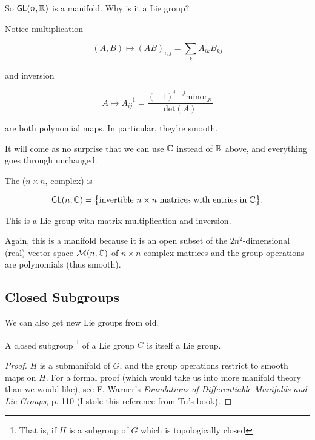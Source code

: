 \documentclass[../main.tex]{subfiles}
\begin{document}
So $\mathsf{GL}(n,\mathbb{R})$ is a manifold. Why is it a Lie group?

Notice multiplication

\[
  (A,B) \mapsto (AB)_{i,j} = \sum_k A_{ik} B_{kj}
\]

and inversion

\[
  A \mapsto A^{-1}_{ij} = \frac{(-1)^{i+j} \text{minor}_{ji}}{\text{det}(A)}
\]

are both polynomial maps. In particular, they're smooth.



\bigskip

It will come as no surprise that we can use $\mathbb{C}$ instead of $\mathbb{R}$ above, and
everything goes through unchanged.

\begin{defn}
  The ($n \times n$, complex)  is

  \[
    \mathsf{GL}(n,\mathbb{C}) = \big \{ \text{invertible $n \times n$ matrices with entries in $\mathbb{C}$} \big \}.
  \]

  This is a Lie group with matrix multiplication and inversion.
\end{defn}

Again, this is a manifold because it is an open subset of the $2n^2$-dimensional
(real) vector space $\mathcal{M}(n,\mathbb{C})$ of $n \times n$ complex matrices and
the group operations are polynomials (thus smooth).

\subsection{Closed Subgroups}

We can also get new Lie groups from old.

\begin{thm}
  A closed subgroup%
  \footnote{That is, if $H$ is a subgroup of $G$ which is topologically closed} 
  of a Lie group $G$ is itself a Lie group.
\end{thm}

\begin{proof}
  $H$ is a submanifold of $G$, and the group operations restrict to smooth
  maps on $H$. For a formal proof (which would take us into more manifold 
  theory than we would like), see F. Warner's 
  \emph{Foundations of Differentiable Manifolds and Lie Groups}, p. 110
  (I stole this reference from Tu's book).
\end{proof}
\end{document}
